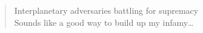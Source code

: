 \documentclass{article}
\begin{document}
\begin{quote}
    Interplanetary adversaries battling for supremacy\\
    Sounds like a good way to build up my infamy\dots~\cite{Deltron3030}
\end{quote}


{}
\end{document}

